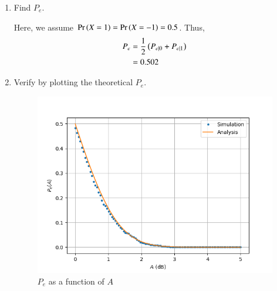 \documentclass[journal,12pt,twocolumn]{IEEEtran}
\renewcommand\thesection{\arabic{section}}
\begin{document}
\begin{enumerate}[label=\thesection.\arabic*
,ref=\thesection.\theenumi]
\solution
Letting $X = 1$ and $X = -1$ respectively, we see the number of mismatched data points to compute the error probabilities. The simulation is coded in
\begin{lstlisting}
$ wget https://raw.githubusercontent.com/goats-9/ai1110-assignments/master/manual/codes/5_4.py
\end{lstlisting}
and can be run by typing
\begin{lstlisting}
$ python3 5_4.py
\end{lstlisting}
The results are
		\begin{align}
			P_{e|0} = 0 \\
			P_{e|1} = 0
		\end{align}
\item Find $P_e$.

\solution
Here, we assume $\Pr\left(X = 1\right) = \Pr\left(X = -1\right) = 0.5$. Thus,
	\begin{align}
		P_e &= \frac{1}{2}\left(P_{e|0} + P_{e|1}\right) \\
		&= 0.502
	\end{align}
\item Verify by plotting the theoretical $P_e$.
	\begin{figure}
		\includegraphics[width=\columnwidth]{figs/5_6.png}
		\caption{$P_e$ as a function of $A$}
		\label{eq:P-e-A}
	\end{figure}


\end{enumerate}
\end{document}
